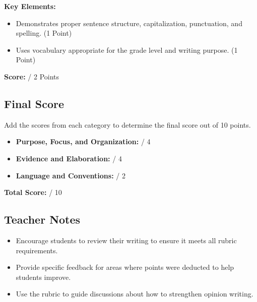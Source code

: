 \documentclass[12pt]{article}
\begin{document}
\begin{tcolorbox}[colframe=black!60, colback=white, title=Language and Conventions (0-2 Points)]
\textbf{Key Elements:}
\begin{itemize}
    \item Demonstrates proper sentence structure, capitalization, punctuation, and spelling. \hfill (1 Point)
    \item Uses vocabulary appropriate for the grade level and writing purpose. \hfill (1 Point)
\end{itemize}
\textbf{Score:} \underline{\hspace{2cm}} / 2 Points
\end{tcolorbox}

\subsection*{Final Score}
\begin{tcolorbox}[colframe=black!60, colback=white, title=Calculating the Final Score]
Add the scores from each category to determine the final score out of 10 points.
\begin{itemize}
    \item \textbf{Purpose, Focus, and Organization:} \underline{\hspace{3cm}} / 4
    \item \textbf{Evidence and Elaboration:} \underline{\hspace{3cm}} / 4
    \item \textbf{Language and Conventions:} \underline{\hspace{3cm}} / 2
\end{itemize}
\textbf{Total Score:} \underline{\hspace{3cm}} / 10
\end{tcolorbox}

\subsection*{Teacher Notes}
\begin{itemize}
    \item Encourage students to review their writing to ensure it meets all rubric requirements.
    \item Provide specific feedback for areas where points were deducted to help students improve.
    \item Use the rubric to guide discussions about how to strengthen opinion writing.
\end{itemize}
\end{document}
